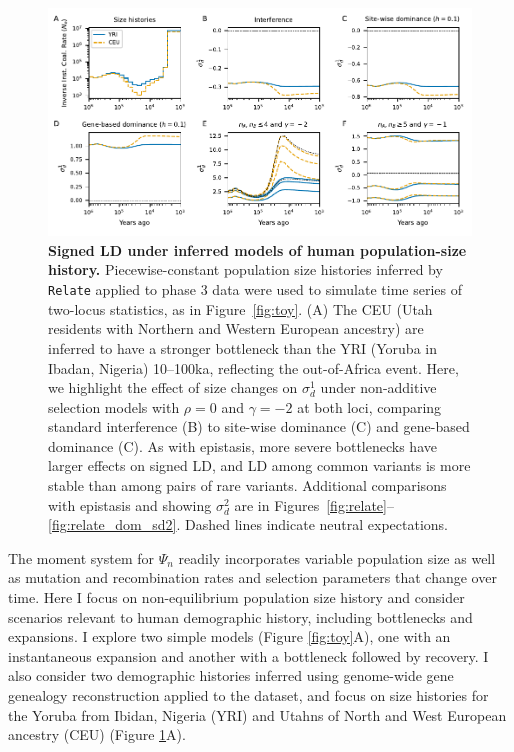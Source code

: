 \documentclass[]{article}
\begin{document}
\begin{figure}[tb!]
    \centering
    \includegraphics{../figures/demog_YRI_CEU.dominance}
    \caption{
        \textbf{Signed LD under inferred models of human population-size history.}
        Piecewise-constant population size histories inferred by \texttt{Relate} applied to
        \citet{1000_Genomes_Project_Consortium2015-zq} phase 3 data were used to
        simulate time series of two-locus statistics, as in Figure~\ref{fig:toy}.
        (A) The CEU (Utah residents with Northern and Western European ancestry)
        are inferred to have a stronger bottleneck than the YRI
        (Yoruba in Ibadan, Nigeria) 10--100ka, reflecting the out-of-Africa
        event.
        Here, we highlight the effect of size changes on \(\sigma_d^1\) under
        non-additive selection models with \(\rho=0\) and \(\gamma=-2\) at both loci,
        comparing standard interference (B) to site-wise dominance (C) and gene-based
        dominance (C).
        As with epistasis, more severe bottlenecks have larger effects on signed LD,
        and LD among common variants is more stable than among pairs of rare variants.
        Additional comparisons with epistasis and showing \(\sigma_d^2\) are
        in Figures~\ref{fig:relate}--\ref{fig:relate_dom_sd2}.
        Dashed lines indicate neutral expectations.
    }
    \label{fig:relate_dom}
\end{figure}

The moment system for \(\Psi_n\) readily incorporates variable population size as
well as mutation and recombination rates and selection parameters that change
over time. Here I focus on non-equilibrium population size history and consider
scenarios relevant to human demographic history, including bottlenecks and
expansions. I explore two simple models (Figure \ref{fig:toy}A), one with an
instantaneous expansion and another with a bottleneck followed by recovery. I
also consider two demographic histories inferred using genome-wide gene
genealogy reconstruction \citep{Speidel2019-nj} applied to the
\citet{1000_Genomes_Project_Consortium2015-zq} dataset, and focus on size histories
for the Yoruba from Ibidan, Nigeria (YRI) and Utahns of North and West European
ancestry (CEU) (Figure \ref{fig:relate_dom}A).
\end{document}
